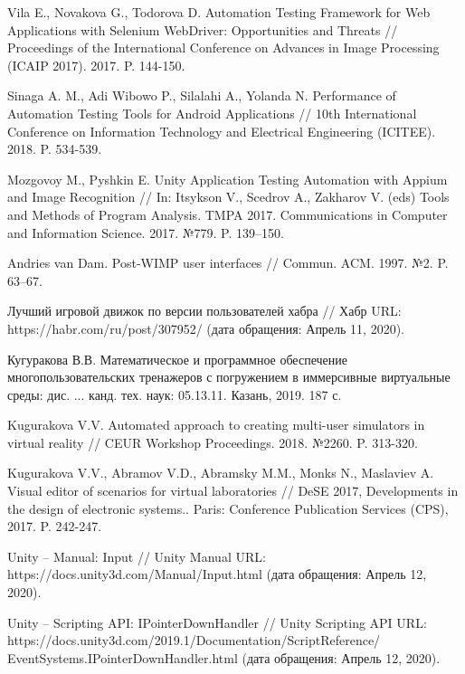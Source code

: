\nocite{*}
%
%
\begin{thebibliography}{9} 
	
	 Vila E., Novakova G., Todorova D. Automation Testing Framework for Web Applications with Selenium WebDriver: Opportunities and Threats // Proceedings of the International Conference on Advances in Image Processing (ICAIP 2017). 2017. P. 144-150.
	
	 Sinaga A. M., Adi Wibowo P., Silalahi A., Yolanda N. Performance of Automation Testing Tools for Android Applications // 10th International Conference on Information Technology and Electrical Engineering (ICITEE). 2018. P. 534-539.
	
	 Mozgovoy M., Pyshkin E. Unity Application Testing Automation with Appium and Image Recognition // In: Itsykson V., Scedrov A., Zakharov V. (eds) Tools and Methods of Program Analysis. TMPA 2017. Communications in Computer and Information Science. 2017. №779. P. 139--150.
	
	 Andries van Dam. Post-WIMP user interfaces // Commun. ACM. 1997. №2. P. 63–67.
	
	 Лучший игровой движок по версии пользователей хабра // Хабр URL: https://habr.com/ru/post/307952/ (дата обращения: Апрель 11, 2020).
	
	 Кугуракова В.В. Математическое и программное обеспечение многопользовательских тренажеров с погружением в иммерсивные виртуальные среды: дис. ... канд. тех. наук: 05.13.11. Казань, 2019. 187 с.
	
	 Kugurakova V.V. Automated approach to creating multi-user simulators in virtual reality // CEUR Workshop Proceedings. 2018. №2260. P. 313-320.  
	
	 Kugurakova V.V., Abramov V.D., Abramsky M.M., Monks N., Maslaviev A. Visual editor of scenarios for virtual laboratories // DeSE 2017, Developments in the design of electronic systems.. Paris: Conference Publication Services (CPS), 2017. P. 242-247.
	
	
	 Unity -- Manual: Input // Unity Manual URL: https://docs.unity3d.com/Manual/Input.html (дата обращения: Апрель 12, 2020).
	
	 Unity -- Scripting API: IPointerDownHandler // Unity Scripting API URL: https://docs.unity3d.com/2019.1/Documentation/ScriptReference/ EventSystems.IPointerDownHandler.html (дата обращения: Апрель 12, 2020).
	

\end{thebibliography}
